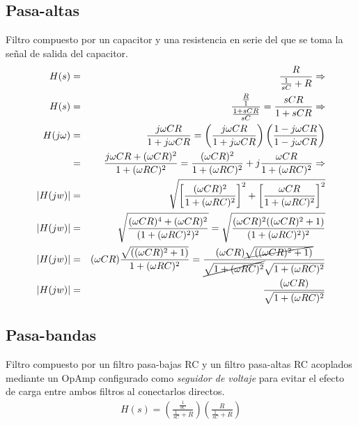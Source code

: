 \documentclass[12pt,spanish,lettersize]{report}
\begin{document}
\subsection{Pasa-altas}
Filtro compuesto por un capacitor y una resistencia en serie del que se toma la se\~nal de salida del capacitor.
\begin{eqnarray}
H(s)&=&\frac{R}{\frac{1}{sC}+R}\Rightarrow\\
\nonumber H(s)&=&\frac{\frac{R}{1}}{\frac{1+sCR}{sC}}=\frac{sCR}{1+sCR}\Rightarrow\\
\nonumber H(j\omega)&=&\frac{j\omega CR}{1+j\omega CR}=\left(\frac{j\omega CR}{1+j\omega CR}\right)\left(\frac{1-j\omega CR}{1-j\omega CR}\right)\\
\nonumber &=&\frac{j\omega CR+(\omega CR)^2}{1+(\omega RC)^2}=\frac{(\omega CR)^2}{1+(\omega RC)^2}+j\frac{\omega CR}{1+(\omega RC)^2}\Rightarrow\\
\nonumber |H(jw)|&=&\sqrt{\left[\frac{(\omega CR)^2}{1+(\omega RC)^2}\right]^2+\left[\frac{\omega CR}{1+(\omega RC)^2}\right]^2}\\
\nonumber |H(jw)|&=&\sqrt{\frac{(\omega CR)^4+(\omega CR)^2}{(1+(\omega RC)^2)^2}}=\sqrt{\frac{(\omega CR)^2((\omega CR)^2+1)}{(1+(\omega RC)^2)^2}}\\
\nonumber |H(jw)|&=&(\omega CR)\frac{\sqrt{((\omega CR)^2+1)}}{1+(\omega RC)^2}=\frac{(\omega CR)\cancel{\sqrt{((\omega CR)^2+1)}}}{\cancel{\sqrt{1+(\omega RC)^2}}\sqrt{1+(\omega RC)^2}}\\
|H(jw)|&=&\frac{(\omega CR)}{\sqrt{1+(\omega RC)^2}}
\end{eqnarray}
\subsection{Pasa-bandas}
Filtro compuesto por un filtro pasa-bajas RC y un filtro pasa-altas RC acoplados mediante un OpAmp configurado como \emph{seguidor de voltaje} para evitar el efecto de carga entre ambos filtros al conectarlos directos.
\begin{eqnarray}
H(s)=\left(\frac{\frac{1}{sC}}{\frac{1}{sC}+R}\right)\left(\frac{R}{\frac{1}{sC}+R}\right)
\end{eqnarray}
\end{document}
